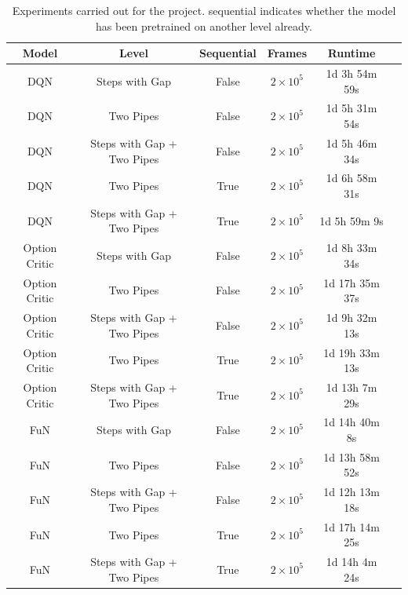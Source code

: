 \documentclass[notitlepage,a4paper,11pt]{article}
\begin{document}
\begin{table}[h!]
\centering
\begin{tabular}{ |c|c|c|c|c|c| } 
 \hline
 \textbf{Model} & \textbf{Level} & \textbf{Sequential} & \textbf{Frames} & \textbf{Runtime}\\
 \hline 
 DQN & Steps with Gap & False & $2 \times 10^5$ & 1d 3h 54m 59s\\ 
 \hline
 DQN & Two Pipes & False & $2 \times 10^5$ & 1d 5h 31m 54s\\ 
 \hline
 DQN & Steps with Gap + Two Pipes & False & $2 \times 10^5$ & 1d 5h 46m 34s \\ 
 \hline
DQN & Two Pipes & True & $2 \times 10^5$ & 1d 6h 58m 31s\\ 
 \hline
 DQN & Steps with Gap + Two Pipes & True & $2 \times 10^5$ & 1d 5h 59m 9s\\ 
 \hline 
 Option Critic & Steps with Gap & False & $2 \times 10^5$ & 1d 8h 33m 34s\\ 
 \hline
 Option Critic & Two Pipes & False & $2 \times 10^5$ & 1d 17h 35m 37s\\ 
 \hline
 Option Critic & Steps with Gap + Two Pipes & False & $2 \times 10^5$ & 1d 9h 32m 13s\\ 
 \hline
Option Critic & Two Pipes & True & $2 \times 10^5$ & 1d 19h 33m 13s\\ 
 \hline
 Option Critic & Steps with Gap + Two Pipes & True & $2 \times 10^5$ & 1d 13h 7m 29s\\ 
 \hline
 
  FuN & Steps with Gap & False & $2 \times 10^5$ & 1d 14h 40m 8s\\ 
 \hline
 FuN & Two Pipes & False & $2 \times 10^5$ & 1d 13h 58m 52s\\ 
 \hline
 FuN & Steps with Gap + Two Pipes & False & $2 \times 10^5$ & 1d 12h 13m 18s\\ 
 \hline
FuN & Two Pipes & True & $2 \times 10^5$ & 1d 17h 14m 25s\\ 
 \hline
 FuN & Steps with Gap + Two Pipes & True & $2 \times 10^5$ & 1d 14h 4m 24s\\ 
 \hline
 
\end{tabular}
\caption{Experiments carried out for the project. sequential indicates whether the model has been pretrained on another level already.}
\label{tbl:experiments}
\end{table}
\end{document}
